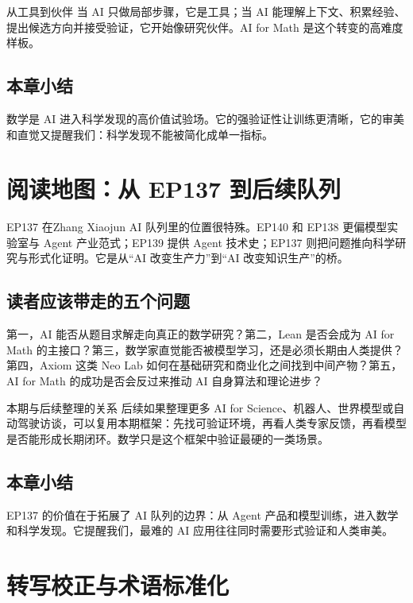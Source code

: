 \documentclass[a4paper]{article}
\begin{document}
\begin{importantbox}{从工具到伙伴}
当 AI 只做局部步骤，它是工具；当 AI 能理解上下文、积累经验、提出候选方向并接受验证，它开始像研究伙伴。AI for Math 是这个转变的高难度样板。
\end{importantbox}

\subsection{本章小结}

数学是 AI 进入科学发现的高价值试验场。它的强验证性让训练更清晰，它的审美和直觉又提醒我们：科学发现不能被简化成单一指标。

\section{阅读地图：从 EP137 到后续队列}

EP137 在Zhang Xiaojun AI 队列里的位置很特殊。EP140 和 EP138 更偏模型实验室与 Agent 产业范式；EP139 提供 Agent 技术史；EP137 则把问题推向科学研究与形式化证明。它是从“AI 改变生产力”到“AI 改变知识生产”的桥。

\subsection{读者应该带走的五个问题}

第一，AI 能否从题目求解走向真正的数学研究？第二，Lean 是否会成为 AI for Math 的主接口？第三，数学家直觉能否被模型学习，还是必须长期由人类提供？第四，Axiom 这类 Neo Lab 如何在基础研究和商业化之间找到中间产物？第五，AI for Math 的成功是否会反过来推动 AI 自身算法和理论进步？

\begin{knowledgebox}{本期与后续整理的关系}
后续如果整理更多 AI for Science、机器人、世界模型或自动驾驶访谈，可以复用本期框架：先找可验证环境，再看人类专家反馈，再看模型是否能形成长期闭环。数学只是这个框架中验证最硬的一类场景。
\end{knowledgebox}

\subsection{本章小结}

EP137 的价值在于拓展了 AI 队列的边界：从 Agent 产品和模型训练，进入数学和科学发现。它提醒我们，最难的 AI 应用往往同时需要形式验证和人类审美。


\section{转写校正与术语标准化}
\end{document}
